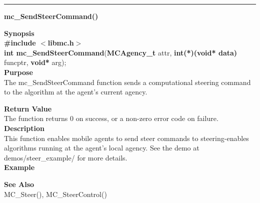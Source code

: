 \noindent
\vspace{5pt}
\rule{6.5in}{0.015in}
\noindent
{}
{\LARGE \bf mc\_SendSteerCommand()}\\

\noindent
{\bf Synopsis}\\
{\bf \#include $<$libmc.h$>$}\\
{\bf int mc\_SendSteerCommand}({\bf MCAgency\_t} attr, {\bf int(*)(void* data)} funcptr, {\bf void*} arg);\\

\noindent
{\bf Purpose}\\
The mc\_SendSteerCommand function sends a computational steering command to the
algorithm at the agent's current agency.

\noindent
{\bf Return Value}\\
The function returns 0 on success, or a non-zero error code on failure. \\

\noindent
{\bf Description}\\
This function enables mobile agents to send steer commands to steering-enables
algorithms running at the agent's local agency. See the demo at 
demos/steer\_example/ for more details. \\

{\bf Example}\\
\noindent
{\footnotesize }

\noindent
{\bf See Also}\\
MC\_Steer(), MC\_SteerControl()

